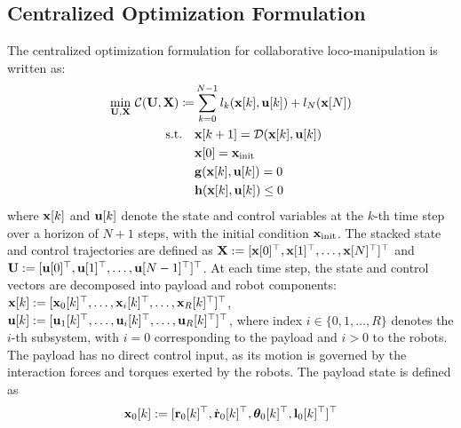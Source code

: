 \subsection{Centralized Optimization Formulation}
The centralized optimization formulation for collaborative loco-manipulation is written as:
\begin{subequations} 
\begin{align}
	\underset{\mathbf{U}, \mathbf{X}}{\text{min}} \ \mathcal{C}(\mathbf{U}, \mathbf{X}) \coloneqq & \sum_{k = 0}^{N-1}l_k(\mathbf{x}[k], \mathbf{u}[k]) + l_N(\mathbf{x}[N]) \\
	\text{s.t.} \quad & \mathbf{x}[k+1] = \mathcal{D}(\mathbf{x}[k], \mathbf{u}[k]) \\
    & \mathbf{x}[0] = \mathbf{x}_{\text{init}} \\
    & \mathbf{g}(\mathbf{x}[k], \mathbf{u}[k]) = 0 \\
    & \mathbf{h}(\mathbf{x}[k], \mathbf{u}[k]) \leq 0
\end{align}
\end{subequations}
where $\mathbf{x}[k]$ and $\mathbf{u}[k]$ denote the state and control variables at the $k$-th time step over a horizon of $N+1$ steps, with the initial condition $\mathbf{x}_{\text{init}}$. The stacked state and control trajectories are defined as $\mathbf{X} := [\mathbf{x}[0]^{\top}, \mathbf{x}[1]^{\top}, \dots,\mathbf{x}[N]^{\top}]^{\top}$ and $\mathbf{U} := [\mathbf{u}[0]^{\top}, \mathbf{u}[1]^{\top}, \dots,\mathbf{u}[N-1]^{\top}]^{\top}$. At each time step, the state and control vectors are decomposed into payload and robot components: $\mathbf{x}[k] := [\mathbf{x}_{0}[k]^{\top}, \dots, \mathbf{x}_{i}[k]^{\top}, \dots,\mathbf{x}_{R}[k]^{\top}]^{\top}$, $\mathbf{u}[k] := [\mathbf{u}_{1}[k]^{\top}, \dots, \mathbf{u}_{i}[k]^{\top}, \dots,\mathbf{u}_{R}[k]^{\top}]^{\top}$,
where index $i \in \{0,1,\dots,R\}$ denotes the $i$-th subsystem, with $i=0$ corresponding to the payload and $i>0$ to the robots. The payload has no direct control input, as its motion is governed by the interaction forces and torques exerted by the robots. The payload state is defined as
\begin{equation}
    \begin{aligned}
        \mathbf{x}_{0}[k] := [\mathbf{r}_{0}[k]^{\top}, \dot{\mathbf{r}}_{0}[k]^{\top}, \bm{\theta}_{0}[k]^{\top}, \mathbf{l}_{0}[k]^{\top}]^{\top}
    \end{aligned}
\end{equation}
